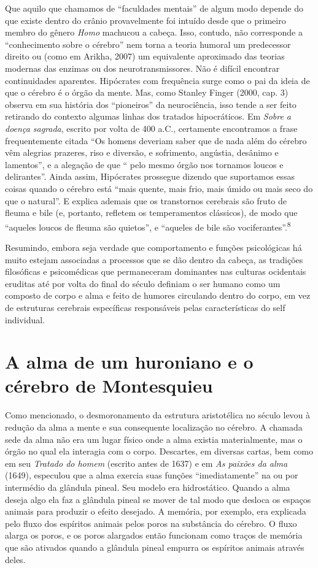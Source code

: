 Que aquilo que chamamos de ``faculdades mentais'' de algum modo depende
do que existe dentro do crânio provavelmente foi intuído desde que o
primeiro membro do gênero \emph{Homo} machucou a cabeça. Isso, contudo,
não corresponde a ``conhecimento sobre o cérebro'' nem torna a teoria
humoral um predecessor direito ou (como em Arikha, 2007) um equivalente
aproximado das teorias modernas das enzimas ou dos neurotransmissores.
Não é difícil encontrar continuidades aparentes. Hipócrates com
frequência surge como o pai da ideia de que o cérebro é o órgão da
mente. Mas, como Stanley Finger (2000, cap. 3) observa em sua história
dos ``pioneiros'' da neurociência, isso tende a ser feito retirando do
contexto algumas linhas dos tratados hipocráticos. Em \emph{Sobre a
doença sagrada}, escrito por volta de 400 a.C., certamente encontramos a
frase frequentemente citada ``Os homens deveriam saber que de nada além
do cérebro vêm alegrias prazeres, riso e diversão, e sofrimento,
angústia, desânimo e lamentos'', e a alegação de que `` pelo mesmo órgão
nos tornamos loucos e delirantes''. Ainda assim, Hipócrates prossegue
dizendo que suportamos essas coisas quando o cérebro está ``mais quente,
mais frio, mais úmido ou mais seco do que o natural''. E explica ademais
que os transtornos cerebrais são fruto de fleuma e bile (e, portanto,
refletem os temperamentos clássicos), de modo que ``aqueles loucos de
fleuma são quietos'', e ``aqueles de bile são
vociferantes''.\textsuperscript{8}

Resumindo, embora seja verdade que comportamento e funções psicológicas
há muito estejam associadas a processos que se dão dentro da cabeça, as
tradições filosóficas e psicomédicas que permaneceram dominantes nas
culturas ocidentais eruditas até por volta do final do século 
definiam o ser humano como um composto de corpo e alma e feito de
humores circulando dentro do corpo, em vez de estruturas cerebrais
específicas responsáveis pelas características do self individual.

\chapter{A alma de um huroniano e o cérebro de Montesquieu}

Como mencionado, o desmoronamento da estrutura aristotélica no século
 levou à redução da alma a mente e sua consequente localização no
cérebro. A chamada sede da alma não era um lugar físico onde a alma
existia materialmente, mas o órgão no qual ela interagia com o corpo.
Descartes, em diversas cartas, bem como em seu \emph{Tratado do homem}
(escrito antes de 1637) e em \emph{As paixões da alma} (1649), especulou
que a alma exercia suas funções ``imediatamente'' na ou por intermédio
da glândula pineal. Seu modelo era hidrostático. Quando a alma deseja
algo ela faz a glândula pineal se mover de tal modo que desloca os
espaços animais para produzir o efeito desejado. A memória, por exemplo,
era explicada pelo fluxo dos espíritos animais pelos poros na substância
do cérebro. O fluxo alarga os poros, e os poros alargados então
funcionam como traços de memória que são ativados quando a glândula
pineal empurra os espíritos animais através deles.

